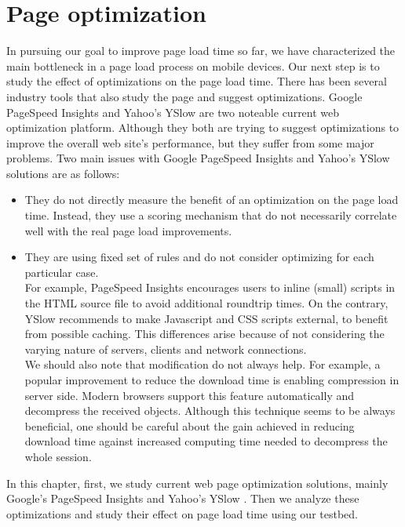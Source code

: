 \chapter{Page optimization}\label{ch:optimization}
In pursuing our goal to improve page load time so far, we have characterized the main bottleneck in a page load process on mobile devices. Our next step is to study the effect of optimizations on the page load time. There has been several industry tools that also study the page and suggest optimizations.
Google PageSpeed Insights \cite{pagespeedinsight} and Yahoo's YSlow \cite{yslow} are two noteable current web optimization platform. Although they both are trying to suggest optimizations to improve the overall web site's performance, but they suffer from some major problems.
Two main issues with Google PageSpeed Insights and Yahoo's YSlow solutions are as follows:
 \begin{itemize}
  \item They do not directly measure the benefit of an optimization on the page load time. Instead, they use a scoring mechanism that do not necessarily correlate well with the real page load improvements.
  \item They are using fixed set of rules and do not consider optimizing for each particular case.\\
   
\noindent For example, PageSpeed Insights encourages users to inline (small) scripts in the HTML source file to avoid additional roundtrip times.
On the contrary,  YSlow recommends to make Javascript and CSS scripts external, to benefit from possible caching. This differences arise because of not considering the varying nature of servers, clients and network connections.\\
\noindent We should also note that modification do not always help.
For example, a popular improvement to reduce the download time is enabling compression in server side. Modern browsers support this feature automatically and decompress the received objects. Although this technique seems to be always beneficial, one should be careful about the gain achieved in reducing download time against increased computing time needed to decompress the whole session.
\end{itemize}

\noindent In this chapter, first, we study current web page optimization solutions, mainly Google's PageSpeed Insights and Yahoo's YSlow . Then we analyze these optimizations and study their effect on page load time using our testbed.

